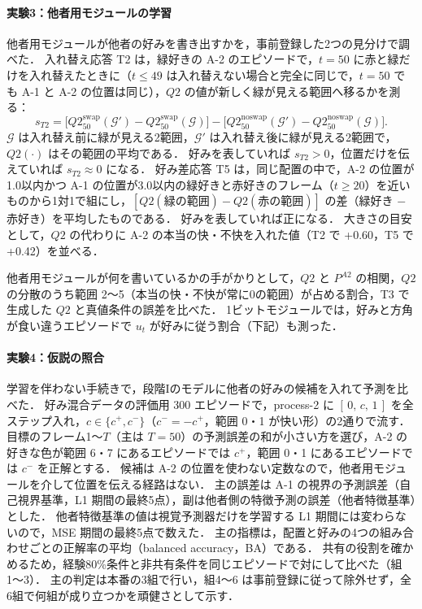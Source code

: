 \paragraph{実験3：他者用モジュールの学習}
他者用モジュールが他者の好みを書き出すかを，事前登録した2つの見分けで調べた．
入れ替え応答 T2 は，緑好きの A-2 のエピソードで，$t=50$ に赤と緑だけを入れ替えたときに（$t\le49$ は入れ替えない場合と完全に同じで，$t=50$ でも A-1 と A-2 の位置は同じ），$Q2$ の値が新しく緑が見える範囲へ移るかを測る：
\begin{equation}
  s_{T2} = \bigl[Q2^{\mathrm{swap}}_{50}(\mathcal{G}') - Q2^{\mathrm{swap}}_{50}(\mathcal{G})\bigr]
         - \bigl[Q2^{\mathrm{noswap}}_{50}(\mathcal{G}') - Q2^{\mathrm{noswap}}_{50}(\mathcal{G})\bigr].
\end{equation}
$\mathcal{G}$ は入れ替え前に緑が見える2範囲，$\mathcal{G}'$ は入れ替え後に緑が見える2範囲で，$Q2(\cdot)$ はその範囲の平均である．
好みを表していれば $s_{T2}>0$，位置だけを伝えていれば $s_{T2}\approx0$ になる．
好み差応答 T5 は，同じ配置の中で，A-2 の位置が1.0以内かつ A-1 の位置が3.0以内の緑好きと赤好きのフレーム（$t\ge20$）を近いものから1対1で組にし，$[Q2(\text{緑の範囲}) - Q2(\text{赤の範囲})]$ の差（緑好き $-$ 赤好き）を平均したものである．
好みを表していれば正になる．
大きさの目安として，$Q2$ の代わりに A-2 の本当の快・不快を入れた値（T2 で +0.60，T5 で +0.42）を並べる．

他者用モジュールが何を書いているかの手がかりとして，$Q2$ と $P^{A2}$ の相関，$Q2$ の分散のうち範囲 2〜5（本当の快・不快が常に0の範囲）が占める割合，T3 で生成した $Q2$ と真値条件の誤差を比べた．
1ビットモジュールでは，好みと方角が食い違うエピソードで $u_t$ が好みに従う割合（下記）も測った．

\paragraph{実験4：仮説の照合}
学習を伴わない手続きで，段階Iのモデルに他者の好みの候補を入れて予測を比べた．
好み混合データの評価用 300 エピソードで，process-2 に $[\,0,\,c,\,1\,]$ を全ステップ入れ，$c\in\{c^{+},c^{-}\}$（$c^{-}=-c^{+}$，範囲 0・1 が快い形）の2通りで流す．
目標のフレーム1〜$T$（主は $T=50$）の予測誤差の和が小さい方を選び，A-2 の好きな色が範囲 6・7 にあるエピソードでは $c^{+}$，範囲 0・1 にあるエピソードでは $c^{-}$ を正解とする．
候補は A-2 の位置を使わない定数なので，他者用モジュールを介して位置を伝える経路はない．
主の誤差は A-1 の視界の予測誤差（自己視界基準，L1 期間の最終5点），副は他者側の特徴予測の誤差（他者特徴基準）とした．
他者特徴基準の値は視覚予測器だけを学習する L1 期間には変わらないので，MSE 期間の最終5点で数えた．
主の指標は，配置と好みの4つの組み合わせごとの正解率の平均（balanced accuracy，BA）である．
共有の役割を確かめるため，経験80\%条件と非共有条件を同じエピソードで対にして比べた（組1〜3）．
主の判定は本番の3組で行い，組4〜6 は事前登録に従って除外せず，全6組で何組が成り立つかを頑健さとして示す．

